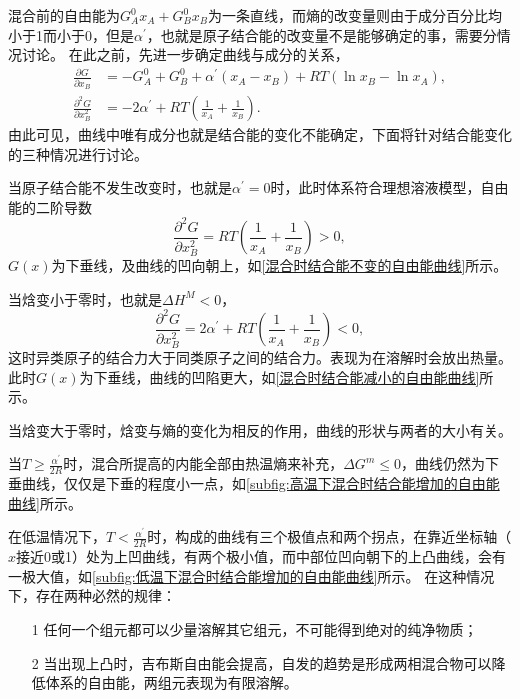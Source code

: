                 混合前的自由能为$G_{A}^{0} x_{A}+G_{B}^{0} x_{B}$为一条直线，而熵的改变量则由于成分百分比均小于1而小于0，但是$\alpha^{\prime}$，也就是原子结合能的改变量不是能够确定的事，需要分情况讨论。
                在此之前，先进一步确定曲线与成分的关系，
                \begin{align}
                    \frac{\partial G}{\partial x_{B}}&=-G_{A}^{0}+G_{B}^{0}+\alpha^{\prime}\left(x_{A}-x_{B}\right)+R T\left(\ln x_{B}-\ln x_{A}\right),\\
                    \frac{\partial^{2} G}{\partial x_{B}^{2}}&=-2 \alpha^{\prime}+R T\left(\frac{1}{x_{A}}+\frac{1}{x_{B}}\right).
                \end{align}
                由此可见，曲线中唯有成分也就是结合能的变化不能确定，下面将针对结合能变化的三种情况进行讨论。

                当原子结合能不发生改变时，也就是$\alpha^{\prime}=0$时，此时体系符合理想溶液模型，自由能的二阶导数
                \begin{equation}
                    \frac{\partial^{2} G}{\partial x_{B}^{2}}=R T\left(\frac{1}{x_{A}}+\frac{1}{x_{B}}\right)>0,
                \end{equation}
                $G(x)$为下垂线，及曲线的凹向朝上，如\autoref{混合时结合能不变的自由能曲线}所示。
                

                当焓变小于零时，也就是$\Delta H^M<0$，
                \begin{equation}
                    \frac{\partial^{2} G}{\partial x_{B}^{2}}=2 \alpha^{\prime}+R T\left(\frac{1}{x_{A}}+\frac{1}{x_{B}}\right)<0,
                \end{equation}
                这时异类原子的结合力大于同类原子之间的结合力。表现为在溶解时会放出热量。此时$G(x)$为下垂线，曲线的凹陷更大，如\autoref{混合时结合能减小的自由能曲线}所示。

                当焓变大于零时，焓变与熵的变化为相反的作用，曲线的形状与两者的大小有关。
                
                
                
                
                当$T\geq\frac{\alpha^{\prime}}{2R}$时，混合所提高的内能全部由热温熵来补充，$\Delta G^m\leq0$，曲线仍然为下垂曲线，仅仅是下垂的程度小一点，如\autoref{subfig:高温下混合时结合能增加的自由能曲线}所示。

                在低温情况下，$T<\frac{\alpha^{\prime}}{2R}$时，构成的曲线有三个极值点和两个拐点，在靠近坐标轴（$x$接近0或1）处为上凹曲线，有两个极小值，而中部位凹向朝下的上凸曲线，会有一极大值，如\autoref{subfig:低温下混合时结合能增加的自由能曲线}所示。
                在这种情况下，存在两种必然的规律：
                \begin{enumerate}
                    \item[1] 任何一个组元都可以少量溶解其它组元，不可能得到绝对的纯净物质；
                    \item[2] 当出现上凸时，吉布斯自由能会提高，自发的趋势是形成两相混合物可以降低体系的自由能，两组元表现为有限溶解。
                \end{enumerate}
